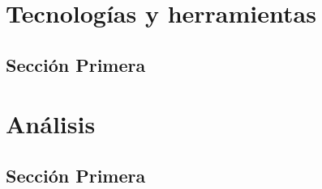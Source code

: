 \documentclass[12pt]{book}
\begin{document}
%



\frontmatter


\mainmatter
\printnoidxglossaries
    

    

    \chapter{Tecnologías y herramientas}
        \section{Sección Primera}
            \lipsum[9-20]

    \chapter{Análisis}
        \section{Sección Primera}
            \lipsum[9-12]

    

    

    
    
    

    
    
\end{document}

